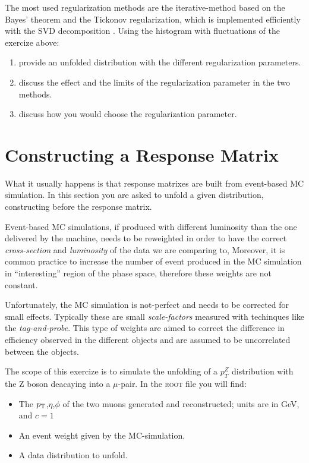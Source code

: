 \documentclass[a4paper,11pt]{article}
\begin{document}
The most used regularization methods are the iterative-method based on the Bayes' theorem \cite{dAgostini} and the Tickonov regularization, which is implemented efficiently with the \gls{SVD} decomposition \cite{SVD}.
Using the histogram with fluctuations of the exercize above:
\begin{enumerate}
	\item provide an unfolded distribution with the different regularization parameters.
	\item discuss the effect and the limits of the regularization parameter in the two methods.
	\item discuss how you would choose the regularization parameter.
\end{enumerate}

\section{Constructing a Response Matrix}

What it usually happens is that response matrixes are built from event-based \gls{MC} simulation.
In this section you are asked to unfold a given distribution, constructing before the response matrix.

Event-based \gls{MC} simulations, 
if produced with different luminosity than the one delivered by the machine, needs to be reweighted 
in order to have the correct \emph{cross-section} and \emph{luminosity} of the data we are comparing to,
Moreover, it is common practice to increase the number of event produced in the \gls{MC} simulation in ``interesting'' 
region of the phase space, therefore these weights are not constant.

Unfortunately, the \gls{MC} simulation is not-perfect and needs to be corrected for small effects.
Typically these are small \emph{scale-factors} measured with techinques like the \emph{tag-and-probe}. 
This type of weights are aimed to correct the difference in efficiency observed in the different objects 
and are assumed to be uncorrelated between the objects.

The scope of this exercize is to simulate the unfolding of a $p_{T}^{Z}$ distribution with the $\mathrm{Z}$ boson deacaying into a $\mu$-pair.
In the {\scshape root} file you will find:
\begin{itemize}
	\item The $p_\textup{T}$,$\eta$,$\phi$ of the two muons generated and reconstructed; units are in GeV, and $c=1$
	\item An event weight given by the \gls{MC}-simulation. 
	\item A data distribution to unfold.
\end{itemize}
\end{document}
